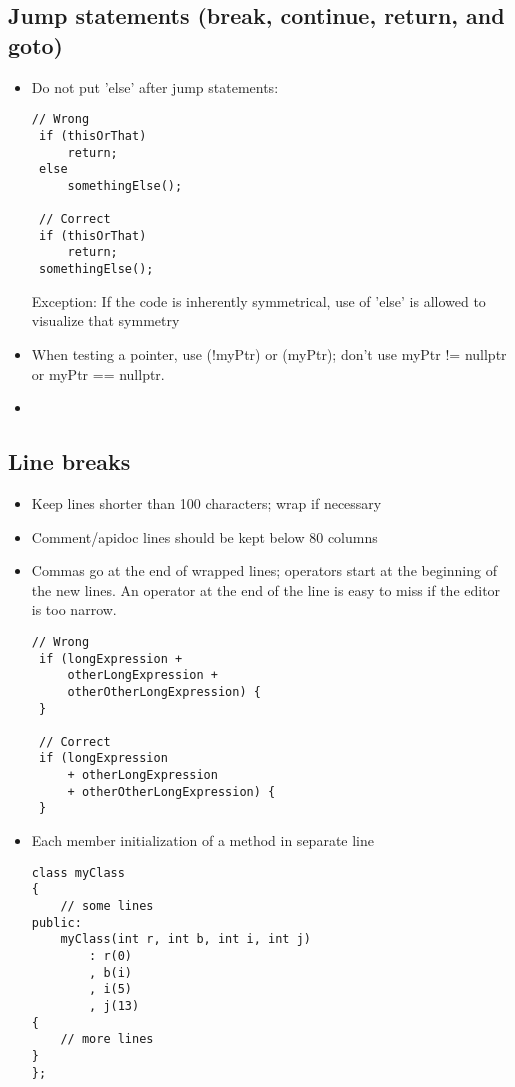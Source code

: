 \documentclass[a4paper,12pt]{article}
\begin{document}
\subsection{Jump statements (break, continue, return, and goto)}
\begin{itemize}
\item  Do not put 'else' after jump statements:
\begin{lstlisting}[breaklines]
 // Wrong
 if (thisOrThat)
     return;
 else
     somethingElse();
 
 // Correct
 if (thisOrThat)
     return;
 somethingElse();
 \end{lstlisting}
Exception: If the code is inherently symmetrical, use of 'else' is allowed to visualize that symmetry
\item When testing a pointer, use (!myPtr) or (myPtr); don't use myPtr != nullptr or myPtr == nullptr.
\item 
\end{itemize}

\subsection{Line breaks}
\begin{itemize}
\item  Keep lines shorter than 100 characters; wrap if necessary
\item  Comment/apidoc lines should be kept below 80 columns
\item  Commas go at the end of wrapped lines; operators start at the beginning of the new lines. An operator at the end of the line is easy to miss if the editor is too narrow.
\begin{lstlisting}[breaklines]
 // Wrong
 if (longExpression +
     otherLongExpression +
     otherOtherLongExpression) {
 }
 
 // Correct
 if (longExpression
     + otherLongExpression
     + otherOtherLongExpression) {
 }
 \end{lstlisting}
\item Each member initialization of a method in separate line
\begin{lstlisting}[breaklines]
class myClass
{
    // some lines
public:
    myClass(int r, int b, int i, int j)
        : r(0)
        , b(i)
        , i(5)
        , j(13)
{
    // more lines
}
};
 \end{lstlisting}
\end{itemize}
\end{document}
